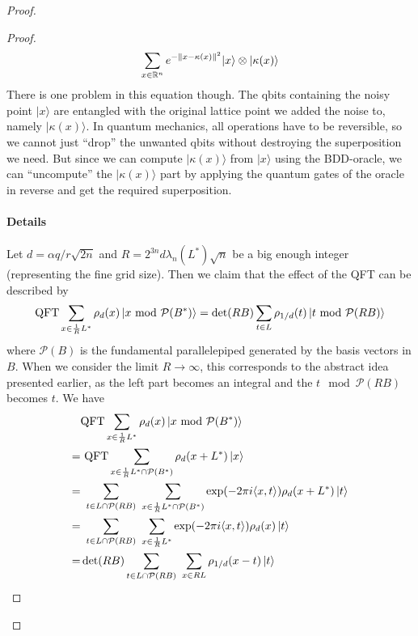 \begin{proof}
\begin{proof}
\begin{equation}
\sum_{x \in \mathbb{R}^n} e^{-\|x - \kappa(x) \|^2} |x\rangle \otimes |\kappa(x)\rangle \nonumber
\end{equation}
There is one problem in this equation though. The qbits containing the noisy point $|x\rangle$ are entangled with the original lattice point we added the noise to, namely $|\kappa(x)\rangle$. In quantum mechanics, all operations have to be reversible, so we cannot just ``drop'' the unwanted qbits without destroying the superposition we need. But since we can compute $|\kappa(x)\rangle$ from $|x\rangle$ using the BDD-oracle, we can ``uncompute'' the $|\kappa(x)\rangle$ part by applying the quantum gates of the oracle in reverse  and get the required superposition.

\paragraph{Details}
Let  $d =\alpha q/ r\sqrt{2n}$ and $R = 2^{3n}d\lambda_n(L^*)\sqrt{n}$ be a big enough integer (representing the fine grid size). Then we claim that the effect of the QFT can be described by
\begin{equation}
\mathrm{QFT} \sum_{x \in \frac 1 R L^*} \rho_d(x) \left|x \text{ mod } \mathcal{P}(B^*)\right\rangle = \det(RB) \sum_{t \in L} \rho_{1/d}(t) \left|t \text{ mod } \mathcal{P}(RB)\right\rangle \label{eq_result_qft}
\end{equation}
where $\mathcal{P}(B)$ is the fundamental parallelepiped generated by the basis vectors in $B$. When we consider the limit $R \to \infty$, this corresponds to the abstract idea presented earlier, as the left part becomes an integral and the $t \mod \mathcal{P}(RB)$ becomes $t$. We have
\begin{equation}
\begin{split}
&\QFT \sum_{x \in \frac 1 R L^*} \rho_d(x) \left|x \mod \mathcal{P}(B^*)\right\rangle \\
=& \ \QFT \sum_{x \in \frac 1 R L^* \cap \mathcal{P}(B^*)} \rho_d(x + L^*) \left|x\right\rangle \\
=& \ \sum_{t \in L \cap \mathcal{P}(RB)} \ \sum_{x \in \frac 1 R L^* \cap \mathcal{P}(B^*)} \exp(-2\pi i \langle x, t \rangle) \rho_d(x + L^*) \left|t\right\rangle \\
=& \ \sum_{t \in L \cap \mathcal{P}(RB)} \ \sum_{x \in \frac 1 R L^*} \exp(-2\pi i \langle x, t \rangle) \rho_d(x) \left|t\right\rangle \\
=& \det(RB)  \sum_{t \in L \cap \mathcal{P}(RB)} \ \sum_{x \in RL} \rho_{1/d}(x - t) \left|t\right\rangle \\

\end{split}
\end{equation}
\end{proof}
\end{proof}
